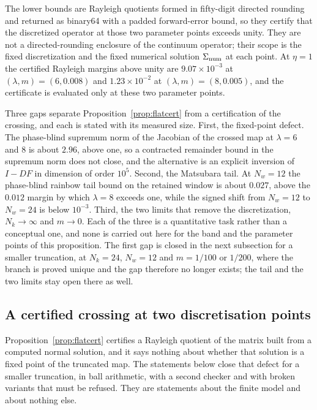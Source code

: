 \documentclass[11pt]{article}
\theoremstyle{definition}
\theoremstyle{remark}
\begin{document}
The lower bounds are Rayleigh quotients formed in fifty-digit directed rounding and returned as binary64 with a padded forward-error bound, so they certify that the discretized operator at those two parameter points exceeds unity. They are not a directed-rounding enclosure of the continuum operator; their scope is the fixed discretization and the fixed numerical solution $\Sigma_{\rm num}$ at each point. At $\eta=1$ the certified Rayleigh margins above unity are $9.07\times10^{-3}$ at $(\lambda,m)=(6,0.008)$ and $1.23\times10^{-2}$ at $(\lambda,m)=(8,0.005)$, and the certificate is evaluated only at these two parameter points.

Three gaps separate Proposition~\ref{prop:flatcert} from a certification of the crossing, and each is stated with its measured size. First, the fixed-point defect. The phase-blind supremum norm of the Jacobian of the crossed map at $\lambda=6$ and $8$ is about $2.96$, above one, so a contracted remainder bound in the supremum norm does not close, and the alternative is an explicit inversion of $I-DF$ in dimension of order $10^5$. Second, the Matsubara tail. At $N_w=12$ the phase-blind rainbow tail bound on the retained window is about $0.027$, above the $0.012$ margin by which $\lambda=8$ exceeds one, while the signed shift from $N_w=12$ to $N_w=24$ is below $10^{-3}$. Third, the two limits that remove the discretization, $N_k\to\infty$ and $m\to0$. Each of the three is a quantitative task rather than a conceptual one, and none is carried out here for the band and the parameter points of this proposition. The first gap is closed in the next subsection for a smaller truncation, at $N_k=24$, $N_w=12$ and $m=1/100$ or $1/200$, where the branch is proved unique and the gap therefore no longer exists; the tail and the two limits stay open there as well.

\subsection{A certified crossing at two discretisation points}\label{sec:certified}

Proposition~\ref{prop:flatcert} certifies a Rayleigh quotient of the matrix built from a computed normal solution, and it says nothing about whether that solution is a fixed point of the truncated map. The statements below close that defect for a smaller truncation, in ball arithmetic, with a second checker and with broken variants that must be refused. They are statements about the finite model and about nothing else.
\end{document}
